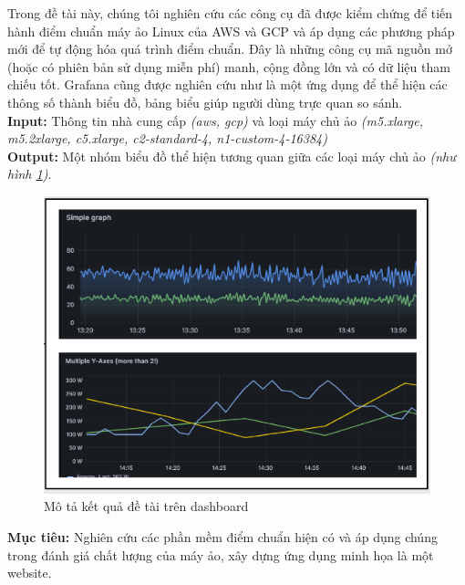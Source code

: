 \documentclass{article}
\begin{document}
Trong đề tài này, chúng tôi nghiên cứu các công cụ đã được kiểm chứng\cite*{Passmark2023Performancetest, Axboe2023fio, Iozone2016Benchmark, OOKLA2023Speedtest} để tiến hành điểm chuẩn máy ảo Linux của AWS và GCP và áp dụng các phương pháp mới để tự động hóa quá trình điểm chuẩn. Đây là những công cụ mã nguồn mở (hoặc có phiên bản sử dụng miễn phí) manh, cộng đồng lớn và có dữ liệu tham chiếu tốt. Grafana\cite{chakraborty2021grafana} cũng được nghiên cứu như là một ứng dụng để thể hiện các thông số thành biểu đồ, bảng biểu giúp người dùng trực quan so sánh. \\

\textbf{Input:} Thông tin nhà cung cấp \textit{(aws, gcp)} và loại máy chủ ảo \textit{(m5.xlarge, m5.2xlarge, c5.xlarge, c2-standard-4, n1-custom-4-16384)}\\

\textbf{Output:} Một nhóm biểu đồ thể hiện tương quan giữa các loại máy chủ ảo \textit{(như hình \ref{fig:grafana-dashboard})}. \\

\begin{figure}[h!]
  \centering
  \includegraphics[scale=1.0]{imgs/grafana-dashboard.png}
  \caption{Mô tả kết quả đề tài trên dashboard}
  \label{fig:grafana-dashboard}
\end{figure}
\textbf{Mục tiêu:} Nghiên cứu các phần mềm điểm chuẩn hiện có\cite*{Passmark2023Performancetest, Axboe2023fio, Iozone2016Benchmark, OOKLA2023Speedtest} và áp dụng chúng trong đánh giá chất lượng của máy ảo, xây dựng ứng dụng minh họa là một website. \\
\end{document}
